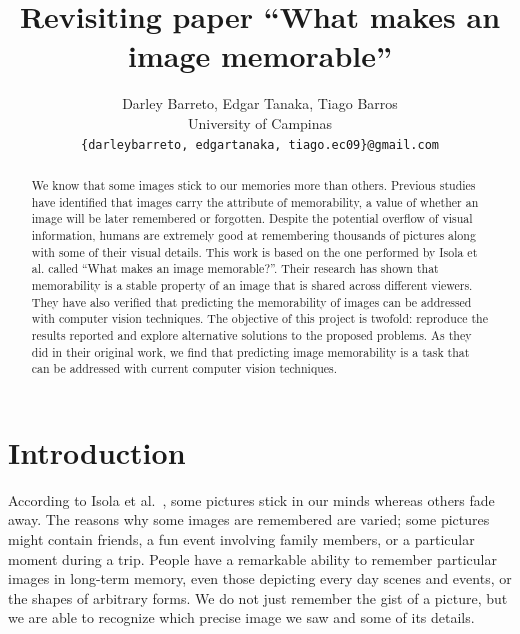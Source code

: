 \documentclass[10pt,twocolumn,letterpaper]{article}
\begin{document}
\title{Revisiting paper ``What makes an image memorable''}

\author{Darley Barreto, Edgar Tanaka, Tiago Barros\\
University of Campinas\\
{\tt\small \{darleybarreto, edgartanaka, tiago.ec09\}@gmail.com}
}

\maketitle

\begin{abstract}
    We know that some images stick to our memories more than others. Previous studies have identified that images carry the attribute of memorability, a value of whether an image will be later remembered or forgotten. Despite the potential overflow of visual information, humans are extremely good at remembering thousands of pictures along with some of their visual details. This work is based on the one performed by Isola et al. called ``What makes an image memorable?''. Their research has shown that memorability is a stable property of an image that is shared across different viewers. They have also verified that predicting the memorability of images can be addressed with computer vision techniques. The objective of this project is twofold: reproduce the results reported and explore alternative solutions to the proposed problems. As they did in their original work, we find that predicting image memorability is a task that can be addressed with current computer vision techniques.
\end{abstract}

\section{Introduction}

According to Isola et al.~\cite{Isola2011}, some pictures stick in our minds whereas others fade away. The reasons why some images are remembered are varied; some pictures might contain friends, a fun event involving family members, or a particular moment during a trip. People have a remarkable ability to remember particular images in long-term memory, even those depicting every day scenes and events, or the shapes of arbitrary forms. We do not just remember the gist of a picture, but we are able to recognize which precise image we saw and some of its details.
\end{document}
